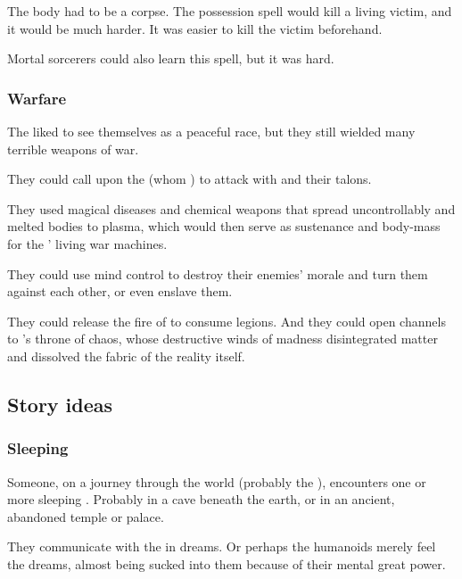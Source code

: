The body had to be a corpse. 
The possession spell would kill a living victim, and it would be much harder. 
It was easier to kill the victim beforehand. 

Mortal sorcerers could also learn this spell, but it was hard.





\subsubsection{Warfare}
The \ophidians liked to see themselves as a peaceful race, but they still wielded many terrible weapons of war.

They could call upon the  (whom ) to attack with  and their talons.

They used magical diseases and chemical weapons that spread uncontrollably and melted bodies to plasma, which would then serve as sustenance and body-mass for the \ophidians' living war machines. 

They could use mind control to destroy their enemies' morale and turn them against each other, or even enslave them.

They could release the fire of  to consume legions. 
And they could open channels to \RuinSatha's throne of chaos, whose destructive winds of madness disintegrated matter and dissolved the fabric of the reality itself. 









\subsection{Story ideas}
\subsubsection{Sleeping \ophidians}
Someone, on a journey through the world (probably the \Wylde{}), encounters one or more sleeping \ophidians{}. 
Probably in a cave beneath the earth, or in an ancient, abandoned temple or palace. 

They communicate with the \ophidians{} in dreams. 
Or perhaps the humanoids merely feel the \psp{\ophidians} dreams, almost being sucked into them because of their mental great power. 

